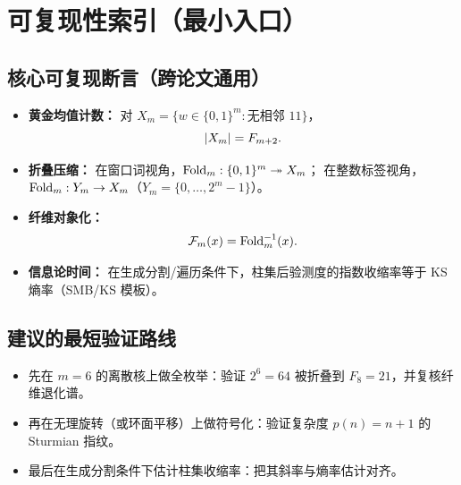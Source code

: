 \section{可复现性索引（最小入口）}

\subsection{核心可复现断言（跨论文通用）}

\begin{itemize}
  \item \textbf{黄金均值计数：}
  对 $X_m=\{w\in\{0,1\}^m:\text{无相邻 }11\}$，
  \[
  \left\lvert X_m\right\rvert=F_{m+2}.
  \]
  \item \textbf{折叠压缩：}
  在窗口词视角，$\mathrm{Fold}_m:\{0,1\}^m\twoheadrightarrow X_m$；
  在整数标签视角，$\mathrm{Fold}_m:Y_m\to X_m$（$Y_m=\{0,\dots,2^m-1\}$）。
  \item \textbf{纤维对象化：}
  \[
  \mathcal{F}_m(x)=\mathrm{Fold}_m^{-1}(x).
  \]
  \item \textbf{信息论时间：}
  在生成分割/遍历条件下，柱集后验测度的指数收缩率等于 KS 熵率（SMB/KS 模板）。
\end{itemize}

\subsection{建议的最短验证路线}

\begin{itemize}
  \item 先在 $m=6$ 的离散核上做全枚举：验证 $2^6=64$ 被折叠到 $F_8=21$，并复核纤维退化谱。
  \item 再在无理旋转（或环面平移）上做符号化：验证复杂度 $p(n)=n+1$ 的 Sturmian 指纹。
  \item 最后在生成分割条件下估计柱集收缩率：把其斜率与熵率估计对齐。
\end{itemize}

